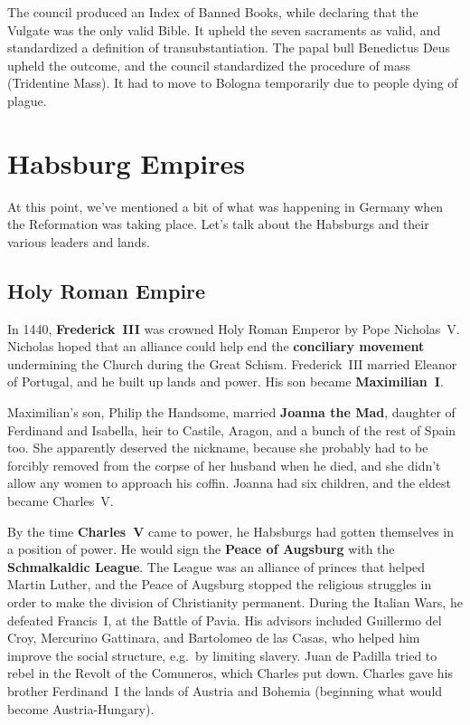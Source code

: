 The council produced an Index of Banned Books,
while declaring that the Vulgate was the only valid Bible.
It upheld the seven sacraments as valid,
and standardized a definition of transubstantiation.
The papal bull Benedictus Deus upheld the outcome,
and the council standardized the procedure of mass (Tridentine Mass).
It had to move to Bologna temporarily due to people dying of plague.

\section{Habsburg Empires}

At this point, we've mentioned a bit of what was happening in Germany when the Reformation was taking place.
Let's talk about the Habsburgs and their various leaders and lands.

\subsection*{Holy Roman Empire}

In 1440, \textbf{Frederick~III} was crowned Holy Roman Emperor by Pope Nicholas~V.
Nicholas hoped that an alliance could help end the \textbf{conciliary movement}
undermining the Church during the Great Schism.
Frederick~III married Eleanor of Portugal, and he built up lands and power.
His son became \textbf{Maximilian~I}.

Maximilian's son, Philip the Handsome, married \textbf{Joanna the Mad}, daughter of Ferdinand and Isabella,
heir to Castile, Aragon, and a bunch of the rest of Spain too.
She apparently deserved the nickname,
because she probably had to be forcibly removed from the corpse of her husband when he died,
and she didn't allow any women to approach his coffin.
Joanna had six children, and the eldest became Charles~V.

By the time \textbf{Charles~V} came to power, he Habsburgs had gotten themselves in a position of power.
He would sign the \textbf{Peace of Augsburg} with the \textbf{Schmalkaldic League}.
The League was an alliance of princes that helped Martin Luther,
and the Peace of Augsburg stopped the religious struggles in order to make the division of Christianity permanent.
During the Italian Wars, he defeated Francis~I, at the Battle of Pavia.
His advisors included Guillermo del Croy, Mercurino Gattinara, and Bartolomeo de las Casas,
who helped him improve the social structure, e.g.\ by limiting slavery.
Juan de Padilla tried to rebel in the Revolt of the Comuneros, which Charles put down.
Charles gave his brother Ferdinand~I the lands of Austria and Bohemia (beginning what would become Austria-Hungary).

